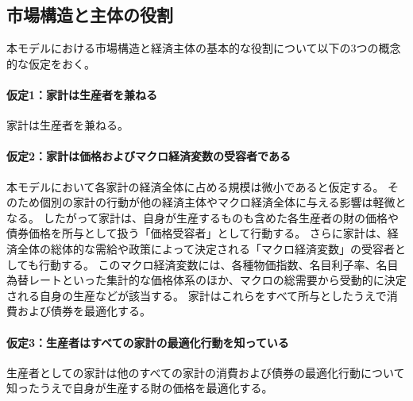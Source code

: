 
\subsection{市場構造と主体の役割}
\label{sec:chapter3_assumptions_market_structure}
本モデルにおける市場構造と経済主体の基本的な役割について以下の3つの概念的な仮定をおく。

\paragraph{仮定1：家計は生産者を兼ねる}
\label{sec:chapter3_assumptions_market_structure_assumption1}
家計は生産者を兼ねる。

\paragraph{仮定2：家計は価格およびマクロ経済変数の受容者である}
\label{sec:chapter3_assumptions_market_structure_assumption2}
本モデルにおいて各家計の経済全体に占める規模は微小であると仮定する。
そのため個別の家計の行動が他の経済主体やマクロ経済全体に与える影響は軽微となる。
したがって家計は、自身が生産するものも含めた各生産者の財の価格や債券価格を所与として扱う「価格受容者」として行動する。
さらに家計は、経済全体の総体的な需給や政策によって決定される「マクロ経済変数」の受容者としても行動する。
このマクロ経済変数には、各種物価指数、名目利子率、名目為替レートといった集計的な価格体系のほか、マクロの総需要から受動的に決定される自身の生産などが該当する。
家計はこれらをすべて所与としたうえで消費および債券を最適化する。

\paragraph{仮定3：生産者はすべての家計の最適化行動を知っている}
\label{sec:chapter3_assumptions_market_structure_assumption3}
生産者としての家計は他のすべての家計の消費および債券の最適化行動について知ったうえで自身が生産する財の価格を最適化する。